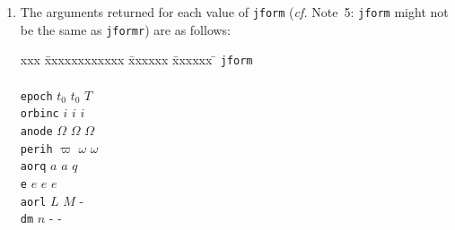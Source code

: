 \documentclass[11pt,fleqn,twoside]{article}
\renewcommand{\_}{{\tt\char'137}}     %
\begin{document}
{\begin{enumerate}
        \begin{tabbing}
        xx \= xxxxxxxxxx \= xxxxxxxxxxx \= \kill
        \> {\tt jformr} \> {\tt jform} \> meaning \\ \\
        \> ~~~~~1   \> ~~~~1  \> OK: elements are in the requested format \\
        \> ~~~~~1   \> ~~~~2  \> never happens \\
        \> ~~~~~1   \> ~~~~3  \> orbit not elliptical \\
        \> ~~~~~2   \> ~~~~1  \> never happens \\
        \> ~~~~~2   \> ~~~~2  \> OK: elements are in the requested format \\
        \> ~~~~~2   \> ~~~~3  \> orbit not elliptical \\
        \> ~~~~~3   \> ~~~~1  \> never happens \\
        \> ~~~~~3   \> ~~~~2  \> never happens \\
        \> ~~~~~3   \> ~~~~3  \> OK: elements are in the requested format
        \end{tabbing}
  \item The arguments returned for each value of
        {\tt jform} ({\it cf.}\/ Note~5:
        {\tt jform} might not be the same as {\tt jformr}) are as follows:
 
        \begin{tabbing}
        xxx \= xxxxxxxxxxxx \= xxxxxx \= xxxxxx \= \kill
        \> {\tt jform}                   \\ \\
        \> {\tt epoch}  \> $t_0$    \> $t_0$    \> $T$ \\
        \> {\tt orbinc} \> $i$      \> $i$      \> $i$ \\
        \> {\tt anode}  \> $\Omega$ \> $\Omega$ \> $\Omega$ \\
        \> {\tt perih}  \> $\varpi$ \> $\omega$ \> $\omega$ \\
        \> {\tt aorq}   \> $a$      \> $a$      \> $q$ \\
        \> {\tt e}      \> $e$      \> $e$      \> $e$ \\
        \> {\tt aorl}   \> $L$      \> $M$      \> - \\
        \> {\tt dm}     \> $n$      \> -        \> -
        \end{tabbing}
 

\end{enumerate}}
\end{document}
